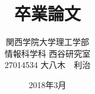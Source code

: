 \title{卒業論文\\}
\author{関西学院大学理工学部\\情報科学科 西谷研究室\\27014534 大八木　利治}
\date{2018年3月}

\maketitle
\newpage
